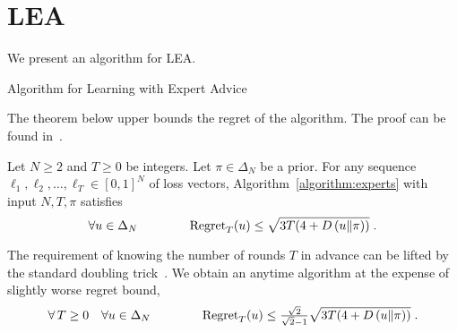 \section{\ac{LEA}}
\label{section:experts}

We present an algorithm for \ac{LEA}.

\begin{algorithm}[h]
\begin{algorithmic}
\caption{Algorithm for Learning with Expert Advice \label{algorithm:experts}}
{
\ENDFOR
}
\end{algorithmic}
\end{algorithm}


The theorem below upper bounds the regret of the algorithm.
The proof can be found in~\cite{Orabona-Pal-2016-parameter-free}.

\begin{theorem}
\label{theorem:experts-regret}
Let $N \ge 2$ and $T \ge 0$ be integers. Let $\pi \in \Delta_N$ be a prior.
For any sequence $\ell_1, \ell_2, \dots, \ell_T \in
[0,1]^N$ of loss vectors, Algorithm~\ref{algorithm:experts}
with input $N,T,\pi$ satisfies
$$
\forall u \in \Delta_N \qquad \qquad \operatorname{Regret}_T(u) \le \sqrt{3T (4 + D\left({u}\middle\|{\pi}\right))} \; .
$$
\end{theorem}

The requirement of knowing the number of rounds $T$ in advance can be lifted by
the standard doubling trick~\citep[Section 2.3.1]{Shalev-Shwartz-2011}. We obtain
an anytime algorithm at the expense of slightly worse regret bound,
$$
\forall \, T \ge 0 \quad \forall u \in \Delta_N \qquad \qquad
\operatorname{Regret}_T(u) \le \tfrac{\sqrt{2}}{\sqrt{2} - 1} \sqrt{3T (4 + D\left({u}\middle\|{\pi}\right))} \; .
$$


